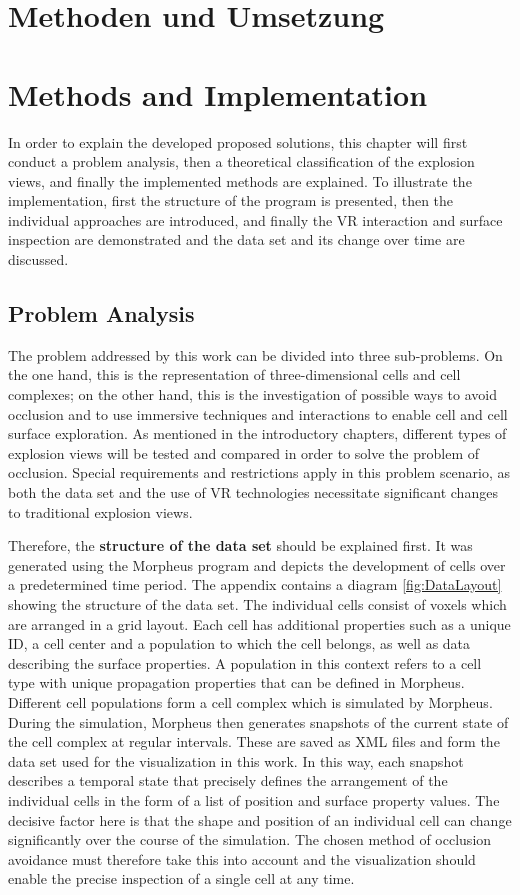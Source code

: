 {\chapter{Methoden und Umsetzung}}
{\chapter{Methods and Implementation}}
\label{sec:methods}


In order to explain the developed proposed solutions, this chapter will first conduct a problem analysis, then a theoretical classification of the explosion views, and finally the implemented methods are explained. 
To illustrate the implementation, first the structure of the program is presented, then the individual approaches are introduced, and finally the VR interaction and surface inspection are demonstrated and the data set and its change over time are discussed.

\section{Problem Analysis}
The problem addressed by this work can be divided into three sub-problems. On the one hand, this is the representation of three-dimensional cells and cell complexes; on the other hand, this is the investigation of possible ways to avoid occlusion and to use immersive techniques and interactions to enable cell and cell surface exploration.
As mentioned in the introductory chapters, different types of explosion views will be tested and compared in order to solve the problem of occlusion.
Special requirements and restrictions apply in this problem scenario, as both the data set and the use of VR technologies necessitate significant changes to traditional explosion views.

Therefore, the \textbf{structure of the data set} should be explained first.
It was generated using the Morpheus program and depicts the development of cells over a predetermined time period.
The appendix contains a diagram \ref{fig:DataLayout} showing the structure of the data set.
The individual cells consist of voxels which are arranged in a grid layout. Each cell has additional properties such as a unique ID, a cell center and a population to which the cell belongs, as well as data describing the surface properties. 
A population in this context refers to a cell type with unique propagation properties that can be defined in Morpheus.
Different cell populations form a cell complex which is simulated by Morpheus. 
During the simulation, Morpheus then generates snapshots of the current state of the cell complex at regular intervals. 
These are saved as XML files and form the data set used for the visualization in this work. 
In this way, each snapshot describes a temporal state that precisely defines the arrangement of the individual cells in the form of a list of position and surface property values.
The decisive factor here is that the shape and position of an individual cell can change significantly over the course of the simulation. 
The chosen method of occlusion avoidance must therefore take this into account and the visualization should enable the precise inspection of a single cell at any time.

